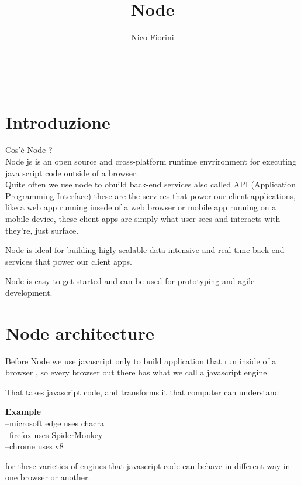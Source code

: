 \documentclass[a4paper,11pt,twoside]{article}
\renewcommand{\maketitle}
{
    \begin{center}
        \huge\bfseries
        \thetitle
        \\ {}
        \vspace{.0em} %
    \end{center}
}
\begin{document}
    \title{Node}
    \author{Nico Fiorini}
    \maketitle

    \section{Introduzione}

    Cos'è Node ? \\{}
    Node js is an open source and cross-platform runtime envrironment for 
    executing java script code outside of a browser.\\{}
    Quite often we use node to obuild back-end services also called API (Application Programming Interface)
    these are the services that power our client applications, like a web app running insede 
    of a web browser or mobile app running on a mobile device, these client apps are 
    simply what user sees and interacts with they're, just surface. 

    
    Node is ideal for building higly-scalable data intensive and real-time back-end services
    that power our client apps.

    Node is easy to get started and can be used for prototyping and agile development.
    

    \section{Node architecture}
    Before Node we use javascript only to build application that run inside of a browser
    , so every browser out there has what we call a javascript engine. 


    That takes javascript code, and transforms it that computer can understand\vspace{1cm}  

    
    \textbf{Example} \\{}
    --microsoft edge uses chacra \\{}
    --firefox uses SpiderMonkey \\{}
    --chrome uses v8\\{}

    
    \hspace{1cm}

    for these varieties of engines that javascript code can behave in different way
    in one browser or another.

    
    
\end{document}
